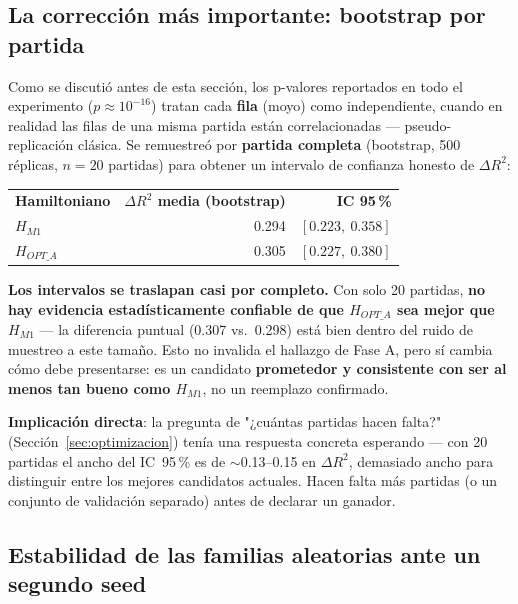 \documentclass[11pt, a4paper]{article}
\newcommand{\TH}[1]{\cellcolor{cTHbg}\color{white}\textbf{#1}}
\begin{document}
\subsection{La correcci\'on m\'as importante: bootstrap por partida}
\label{sec:bootstrap}

Como se discuti\'o antes de esta secci\'on, los p-valores reportados en
todo el experimento ($p\approx10^{-16}$) tratan cada \textbf{fila}
(moyo) como independiente, cuando en realidad las filas de una misma
partida est\'an correlacionadas --- pseudo-replicaci\'on cl\'asica. Se
remuestre\'o por \textbf{partida completa} (bootstrap, 500 r\'eplicas,
$n=20$ partidas) para obtener un intervalo de confianza honesto de
$\Delta R^2$:

\medskip
\begin{center}
\begin{tabular}{lrr}
  \TH{Hamiltoniano} & \TH{$\Delta R^2$ media (bootstrap)} & \TH{IC 95\,\%} \\[1pt]
  $H_{M1}$      & 0.294 & $[0.223,\ 0.358]$ \\
  $H_{OPT\_A}$  & 0.305 & $[0.227,\ 0.380]$ \\
\end{tabular}
\end{center}
\medskip

\begin{tcolorbox}[quotebox]
  \textbf{Los intervalos se traslapan casi por completo.} Con solo 20
  partidas, \textbf{no hay evidencia estad\'isticamente confiable de
  que $H_{OPT\_A}$ sea mejor que $H_{M1}$} --- la diferencia puntual
  (0.307 vs.\ 0.298) est\'a bien dentro del ruido de muestreo a este
  tama\~no. Esto no invalida el hallazgo de Fase A, pero s\'i cambia
  c\'omo debe presentarse: es un candidato \textbf{prometedor y
  consistente con ser al menos tan bueno como $H_{M1}$}, no un
  reemplazo confirmado.
\end{tcolorbox}

\textbf{Implicaci\'on directa}: la pregunta de "¿cu\'antas partidas
hacen falta?" (Secci\'on~\ref{sec:optimizacion}) ten\'ia una respuesta
concreta esperando --- con 20 partidas el ancho del IC~95\,\% es de
$\sim$0.13--0.15 en $\Delta R^2$, demasiado ancho para distinguir entre
los mejores candidatos actuales. Hacen falta m\'as partidas (o un
conjunto de validaci\'on separado) antes de declarar un ganador.

\subsection{Estabilidad de las familias aleatorias ante un segundo seed}
\end{document}
